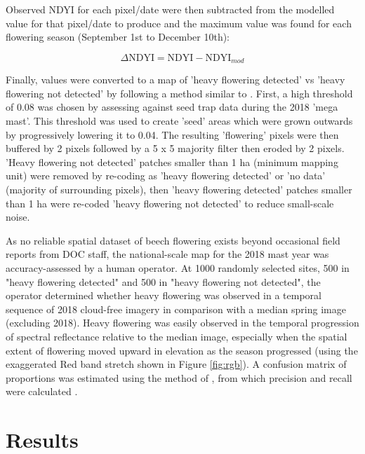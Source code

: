 \documentclass[remotesensing,article,submit,moreauthors,pdftex]{Definitions/mdpi}
\begin{document}
Observed NDYI for each pixel/date were then subtracted from the modelled value for that pixel/date to produce \dndyi{} and the maximum value was found for each flowering season (September 1st to December 10th):

\begin{equation}
    \Delta\text{NDYI} = \text{NDYI} - \text{NDYI}_{mod}
\end{equation}

Finally, \dndyi{} values were converted to a map of 'heavy flowering detected' vs 'heavy flowering not detected' by following a method similar to \citet{Shepherd2007}. First, a high \dndyi{} threshold of 0.08 was chosen by assessing \dndyi{} against seed trap data \citep{Elliott2016} during the 2018 'mega mast'. This threshold was used to create 'seed' areas which were grown outwards by progressively lowering it to 0.04. The resulting 'flowering' pixels were then buffered by 2 pixels followed by a 5 x 5 majority filter then eroded by 2 pixels. 'Heavy flowering not detected' patches smaller than 1 ha (minimum mapping unit) were removed by re-coding as 'heavy flowering detected' or 'no data' (majority of surrounding pixels), then 'heavy flowering detected' patches smaller than 1 ha were re-coded 'heavy flowering not detected' to reduce small-scale noise. 

As no reliable spatial dataset of beech flowering exists beyond occasional field reports from DOC staff, the national-scale map for the 2018 mast year was accuracy-assessed by a human operator. At 1000 randomly selected sites, 500 in "heavy flowering detected" and 500 in "heavy flowering not detected", the operator determined whether heavy flowering was observed in a temporal sequence of 2018 cloud-free imagery in comparison with a median spring image (excluding 2018). Heavy flowering was easily observed in the temporal progression of spectral reflectance relative to the median image, especially when the spatial extent of flowering moved upward in elevation as the season progressed (using the exaggerated Red band stretch shown in Figure \ref{fig:rgb}). A confusion matrix of proportions was estimated using the method of \citet{Card1982}, from which precision and recall were calculated \citep{Maxwell2021}.


\section{Results}
\end{document}
